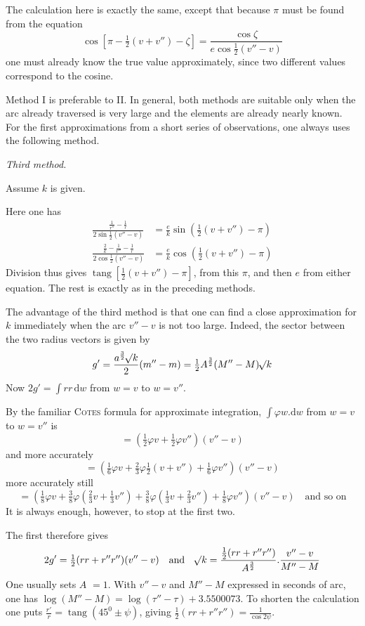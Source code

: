 The calculation here is exactly the same, except that because $\pi$ must be found from the equation
\[
\cos[\pi-\tfrac12(v+v'')-\zeta]=\frac{\cos\zeta}{e\cos\tfrac12(v''-v)}
\]
one must already know the true value approximately, since two different values correspond to the cosine.

Method I is preferable to II. In general, both methods are suitable only when the arc already traversed is very large and the elements are already nearly known. For the first approximations from a short series of observations, one always uses the following method.

\par\medskip\emph{Third method.}\par
Assume $k$ is given.

Here one has
\[
\begin{aligned}
\frac{\frac1{r''}-\frac1r}{2\sin\tfrac12(v''-v)}&=\frac ek\sin(\tfrac12(v+v'')-\pi)\\
\frac{\frac2k-\frac1{r''}-\frac1r}{2\cos\tfrac12(v''-v)}&=\frac ek\cos(\tfrac12(v+v'')-\pi)
\end{aligned}
\]
Division thus gives $\operatorname{tang}[\tfrac12(v+v'')-\pi]$, from this $\pi$, and then $e$ from either equation. The rest is exactly as in the preceding methods.

The advantage of the third method is that one can find a close approximation for $k$ immediately when the arc $v''-v$ is not too large. Indeed, the sector between the two radius vectors is given by
\[
g'=\frac{a^{\frac32}\mathord{{}^{}\!\surd}k}2(m''-m)=\tfrac12A^{\frac32}(M''-M)\mathord{{}^{}\!\surd}k
\]
Now $2g'=\int rr\,\mathrm{d}w$ from $w=v$ to $w=v''$.

By the familiar \textsc{Cotes} formula for approximate integration, $\int\varphi w.\mathrm{d}w$ from $w=v$ to $w=v''$ is
\[
=(\tfrac12\varphi v+\tfrac12\varphi v'')(v''-v)
\]
%
and more accurately
\[
=(\tfrac16\varphi v+\tfrac23\varphi\tfrac12(v+v'')+\tfrac16\varphi v'')(v''-v)
\]
more accurately still
\[
=(\tfrac18\varphi v+\tfrac38\varphi(\tfrac23v+\tfrac13v'')+\tfrac38\varphi(\tfrac13v+\tfrac23v'')+\tfrac18\varphi v'')(v''-v)\quad\text{and so on}
\]
It is always enough, however, to stop at the first two.

The first therefore gives
\[
2g'=\tfrac12(rr+r''r'')(v''-v)\quad\text{and}\quad\mathord{{}^{}\!\surd}k=\frac{\tfrac12(rr+r''r'')}{A^{\frac32}}.\frac{v''-v}{M''-M}
\]
One usually sets $A$ $=1$. With $v''-v$ and $M''-M$ expressed in seconds of arc, one has $\log(M''-M)=\log(\tau''-\tau)+3.5500073$. To shorten the calculation one puts $\frac{r'}r=\operatorname{tang}(45^0\pm\psi)$, giving $\tfrac12(rr+r''r'')=\frac1{\cos2\psi}$.

